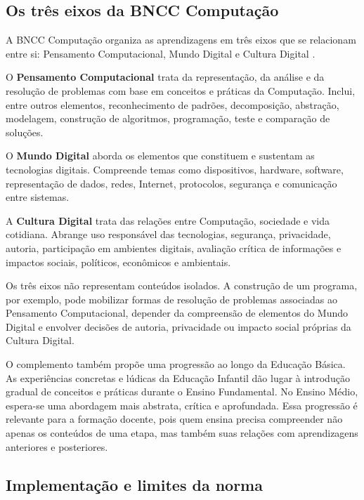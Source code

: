 \subsection{Os três eixos da BNCC Computação}
\label{subsec:eixos-bncc-computacao}

A BNCC Computação organiza as aprendizagens em três eixos que se relacionam entre si: Pensamento Computacional, Mundo Digital e Cultura Digital \cite{brasil2022bncccomputacao}.

O \textbf{Pensamento Computacional} trata da representação, da análise e da resolução de problemas com base em conceitos e práticas da Computação. Inclui, entre outros elementos, reconhecimento de padrões, decomposição, abstração, modelagem, construção de algoritmos, programação, teste e comparação de soluções.

O \textbf{Mundo Digital} aborda os elementos que constituem e sustentam as tecnologias digitais. Compreende temas como dispositivos, hardware, software, representação de dados, redes, Internet, protocolos, segurança e comunicação entre sistemas.

A \textbf{Cultura Digital} trata das relações entre Computação, sociedade e vida cotidiana. Abrange uso responsável das tecnologias, segurança, privacidade, autoria, participação em ambientes digitais, avaliação crítica de informações e impactos sociais, políticos, econômicos e ambientais.

Os três eixos não representam conteúdos isolados. A construção de um programa, por exemplo, pode mobilizar formas de resolução de problemas associadas ao Pensamento Computacional, depender da compreensão de elementos do Mundo Digital e envolver decisões de autoria, privacidade ou impacto social próprias da Cultura Digital.

O complemento também propõe uma progressão ao longo da Educação Básica. As experiências concretas e lúdicas da Educação Infantil dão lugar à introdução gradual de conceitos e práticas durante o Ensino Fundamental. No Ensino Médio, espera-se uma abordagem mais abstrata, crítica e aprofundada. Essa progressão é relevante para a formação docente, pois quem ensina precisa compreender não apenas os conteúdos de uma etapa, mas também suas relações com aprendizagens anteriores e posteriores.

\subsection{Implementação e limites da norma}
\label{subsec:implementacao-limites-norma}

